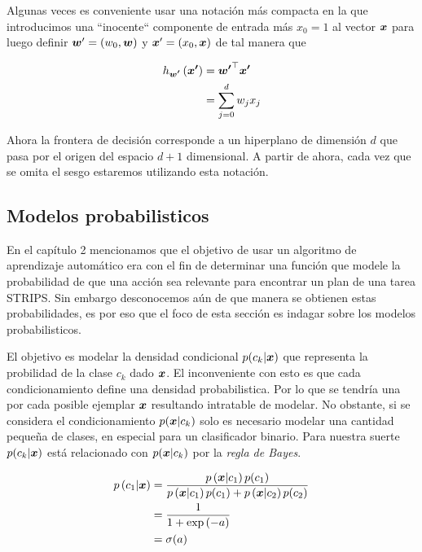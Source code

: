 Algunas veces es conveniente usar una notación más compacta en la que
introducimos una ``inocente`` componente de entrada más $x_0 = 1$ al vector
$\boldsymbol{x}$ para luego definir $\boldsymbol{w}' = (w_0, \boldsymbol{w})$ y $\boldsymbol{x}' = (x_0,
\boldsymbol{x})$ de tal manera que 

\begin{align}
    h_{\boldsymbol{w'}}\left( \boldsymbol{x'} \right) &= \boldsymbol{w'}^{\top} \boldsymbol{x'}\\
                                           &= \sum_{j = 0 }^{d} w_j x_j
\end{align}

Ahora la frontera de decisión corresponde a un hiperplano de dimensión $d$ que
pasa por el origen del espacio $d + 1$ dimensional. A partir de ahora, cada vez
que se omita el sesgo estaremos utilizando esta notación.

\subsection{Modelos probabilisticos}

En el capítulo 2 mencionamos que el objetivo de usar un algoritmo de aprendizaje
automático era con el fin de determinar una función que modele la probabilidad
de que una acción sea relevante para encontrar un plan de una tarea STRIPS. Sin
embargo desconocemos aún de que manera se obtienen estas probabilidades, es por
eso que el foco de esta sección es indagar sobre los modelos probabilisticos.

El objetivo es modelar la densidad condicional $p(c_k | \boldsymbol{x})$ que
representa la probilidad de la clase $c_k$ dado $\boldsymbol{x}$. El inconveniente con
esto es que cada condicionamiento define una densidad probabilistica. Por lo que
se tendría una por cada posible ejemplar $\boldsymbol{x}$ resultando intratable de
modelar. No obstante, si se considera el condicionamiento $p(\boldsymbol{x} | c_k)$
solo es necesario modelar una cantidad pequeña de clases, en especial para un
clasificador binario. Para nuestra suerte $p(c_k | \boldsymbol{x})$ está relacionado
con $p(\boldsymbol{x} | c_k)$ por la \emph{regla de Bayes}.

\begin{align}
    p\left( c_1 | \boldsymbol{x} \right) &= \frac{p\left( \boldsymbol{x} | c_1 \right)p(c_1)}{
                                            p\left( \boldsymbol{x} | c_1 \right) p(c_1) + 
                                            p\left( \boldsymbol{x} | c_2 \right)p(c_2)} \\
                                   &= \frac{1}{1 + \exp\left( -a \right)} \\
                                   &= \sigma(a)
\end{align}

